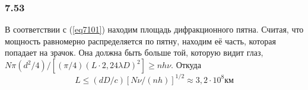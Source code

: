 \subsubsection*{7.53}
В соответствии с (\ref{eq7101}) находим площадь дифракционного пятна. Считая, что мощность равномерно распределяется по пятну, находим её часть, которая попадает на зрачок. Она должна быть больше той, которую видит глаз, $N \pi(d^2/4) /[(\pi/4) (L \cdot 2,24 \lambda D)^2] \geq n h \nu$. Откуда 
\begin{equation*}
	L \leq (dD/c)[N\nu /(nh)]^{1/2} \approx 3,2 \cdot 10^8 км
\end{equation*}